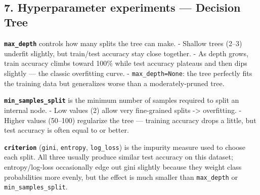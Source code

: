 \documentclass[11pt]{article}
\begin{document}
    \begin{center}
    \end{center}
    { \hspace*{\fill} \\}
    
    \subsection{7. Hyperparameter experiments --- Decision
Tree}\label{hyperparameter-experiments-decision-tree}

\textbf{\texttt{max\_depth}} controls how many splits the tree can make.
- Shallow trees (2--3) underfit slightly, but train/test accuracy stay
close together. - As depth grows, train accuracy climbs toward 100\%
while test accuracy plateaus and then dips slightly --- the classic
overfitting curve. - \texttt{max\_depth=None}: the tree perfectly fits
the training data but generalizes worse than a moderately-pruned tree.

\textbf{\texttt{min\_samples\_split}} is the minimum number of samples
required to split an internal node. - Low values (2) allow very
fine-grained splits -\textgreater{} overfitting. - Higher values
(50--100) regularize the tree --- training accuracy drops a little, but
test accuracy is often equal to or better.

\textbf{\texttt{criterion}} (\texttt{gini}, \texttt{entropy},
\texttt{log\_loss}) is the impurity measure used to choose each split.
All three usually produce similar test accuracy on this dataset;
entropy/log-loss occasionally edge out gini slightly because they weight
class probabilities more evenly, but the effect is much smaller than
\texttt{max\_depth} or \texttt{min\_samples\_split}.
\end{document}
